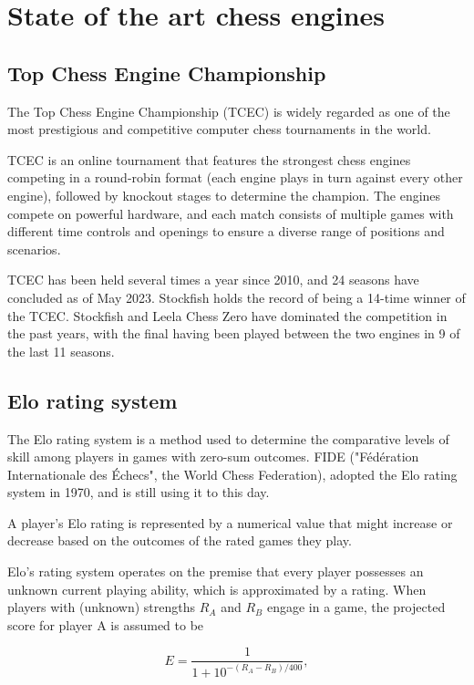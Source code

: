 \chapter{State of the art chess engines}
\label{chap:ch3}

\section{Top Chess Engine Championship}
\label{sec:ch3sec1}

The Top Chess Engine Championship (TCEC) is widely regarded as one of the most prestigious and competitive computer chess tournaments in the world.

TCEC is an online tournament that features the strongest chess engines competing in a round-robin format (each engine plays in turn against every other engine), followed by knockout stages to determine the champion. The engines compete on powerful hardware, and each match consists of multiple games with different time controls and openings to ensure a diverse range of positions and scenarios.

TCEC has been held several times a year since 2010, and 24 seasons have concluded as of May 2023. Stockfish holds the record of being a 14-time winner of the TCEC. Stockfish and Leela Chess Zero have dominated the competition in the past years, with the final having been played between the two engines in 9 of the last 11 seasons.

\section{Elo rating system}
\label{sec:ch3sec2}

The Elo rating system is a method used to determine the comparative levels of skill among players in games with zero-sum outcomes. FIDE ("Fédération Internationale des Échecs", the World Chess Federation), adopted the Elo rating system in 1970, and is still using it to this day.

A player's Elo rating is represented by a numerical value that might increase or decrease based on the outcomes of the rated games they play.

Elo's rating system operates on the premise that every player possesses an unknown current playing ability, which is approximated by a rating. When players with (unknown) strengths $R_A$ and $R_B$ engage in a game, the projected score for player A is assumed to be

\[E=\frac{1}{1+10^{-(R_A-R_B)/400}},\]


